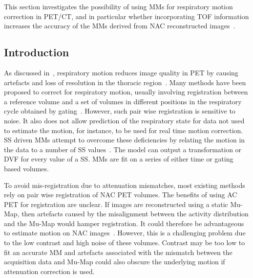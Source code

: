     
        This section investigates the possibility of using \glspl{MM} for respiratory motion correction in \gls{PET}/\gls{CT}, and in particular whether incorporating \gls{TOF} information increases the accuracy of the \glspl{MM} derived from \gls{NAC} reconstructed images~\parencite{Whitehead2019ImpactPET}.
        
        \subsection{Introduction} \label{sec:impact_of_tof_on_respiratory_motion_model_estimation_using_pre_gated_no_intra_cycle_motion_nAC_pet_introduction}
        As discussed in~, respiratory motion reduces image quality in \gls{PET} by causing artefacts and loss of resolution in the thoracic region~\parencite{Nehmeh2008a}. Many methods have been proposed to correct for respiratory motion, usually involving registration between a reference volume and a set of volumes in different positions in the respiratory cycle obtained by gating~\parencite{Oliveira2014}. However, such pair wise registration is sensitive to noise. It also does not allow prediction of the respiratory state for data not used to estimate the motion, for instance, to be used for real time motion correction. \gls{SS} driven \glspl{MM} attempt to overcome these deficiencies by relating the motion in the data to a number of \gls{SS} values~\parencite{McClelland2013}. The model can output a transformation or \gls{DVF} for every value of a \gls{SS}. \glspl{MM} are fit on a series of either time or gating based volumes.

        To avoid mis-registration due to attenuation mismatches, most existing methods rely on pair wise registration of \gls{NAC} \gls{PET} volumes. The benefits of using \gls{AC} \gls{PET} for registration are unclear. If images are reconstructed using a static \gls{Mu-Map}, then artefacts caused by the misalignment between the activity distribution and the \gls{Mu-Map} would hamper registration. It could therefore be advantageous to estimate motion on \gls{NAC} images~\parencite{LungMotionDiaphragmBaiBib, Kalantari2017AttenuationRegistration:, Dawood2008RespiratoryAlgorithms, Dawood2006LungImages}. However, this is a challenging problem due to the low contrast and high noise of these volumes. Contrast may be too low to fit an accurate \gls{MM} and artefacts associated with the mismatch between the acquisition data and \gls{Mu-Map} could also obscure the underlying motion if attenuation correction is used.
        
